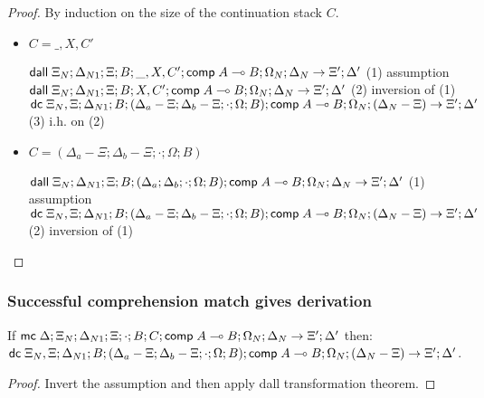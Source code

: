 \begin{proof}
   By induction on the size of the continuation stack $C$.
   
   \begin{itemize}
      \item $C = \_, X, C'$
      
      $\mathsf{dall} \; \Xi_N; \Delta_{N1}; \Xi; B; \_, X, C'; \mathsf{comp} \; A \multimap B; \Omega_N; \Delta_N \rightarrow \Xi'; \Delta'$ \hfill (1) assumption \\
      $\mathsf{dall} \; \Xi_N; \Delta_{N1}; \Xi; B; X, C'; \mathsf{comp} \; A \multimap B; \Omega_N; \Delta_N \rightarrow \Xi'; \Delta'$ \hfill (2) inversion of (1) \\
      $\mathsf{dc} \; \Xi_N, \Xi; \Delta_{N1}; B; (\Delta_a - \Xi; \Delta_b - \Xi; \cdot; \Omega; B); \mathsf{comp} \; A \multimap B; \Omega_N; (\Delta_N - \Xi) \rightarrow \Xi'; \Delta'$ \hfill (3) i.h. on (2) \\
      
      \item $C = (\Delta_a - \Xi; \Delta_b - \Xi; \cdot; \Omega; B)$
      
      $\mathsf{dall} \; \Xi_N; \Delta_{N1}; \Xi; B; (\Delta_a; \Delta_b; \cdot; \Omega; B); \mathsf{comp} \; A \multimap B; \Omega_N; \Delta_N \rightarrow \Xi'; \Delta'$ \hfill (1) assumption \\
      $\mathsf{dc} \; \Xi_N, \Xi; \Delta_{N1}; B; (\Delta_a - \Xi; \Delta_b - \Xi; \cdot; \Omega; B); \mathsf{comp} \; A \multimap B; \Omega_N; (\Delta_N - \Xi) \rightarrow \Xi'; \Delta'$ \hfill (2) inversion of (1) \\
   \end{itemize}
\end{proof}

\subsubsection{Successful comprehension match gives derivation}

If $\mathsf{mc} \; \Delta; \Xi_N; \Delta_{N1}; \Xi; \cdot; B; C; \mathsf{comp} \; A \multimap B; \Omega_N; \Delta_N \rightarrow \Xi'; \Delta'$ then:\\
\hspace{1cm} $\mathsf{dc} \; \Xi_N, \Xi; \Delta_{N1}; B; (\Delta_a - \Xi; \Delta_b - \Xi; \cdot; \Omega; B); \mathsf{comp} \; A \multimap B; \Omega_N; (\Delta_N - \Xi) \rightarrow \Xi'; \Delta'$.

\begin{proof}
   Invert the assumption and then apply dall transformation theorem.
\end{proof}

